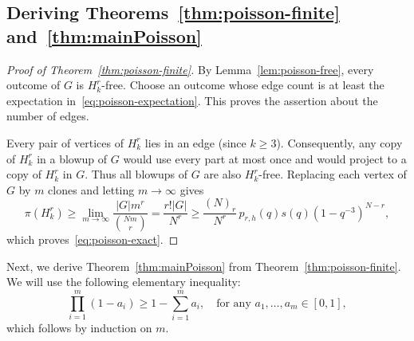 \documentclass[10pt,a4paper]{article}
\numberwithin{equation}{section}
\theoremstyle{definition}
\theoremstyle{remark}
\begin{document}
\subsection{Deriving  Theorems~\ref{thm:poisson-finite} and~\ref{thm:mainPoisson}}


\begin{proof}[Proof of Theorem~\ref{thm:poisson-finite}]
	By Lemma~\ref{lem:poisson-free}, every outcome of $G$ is $H_k^r$-free. Choose an outcome whose edge count is at least the expectation in~\eqref{eq:poisson-expectation}. This proves the assertion about the number of edges.
	
	Every pair of vertices of $H_k^r$ lies in an edge (since $k\ge 3$). Consequently, any copy of $H_k^r$ in a blowup of $G$ would use every part at most once and would project to a copy of $H_k^r$ in $G$. Thus all blowups of $G$ are also $H_k^r$-free. Replacing each vertex of $G$ by $m$ clones and letting $m\to\infty$ gives
	\[
	\pi(H_k^r)\ge\lim_{m\to\infty}\frac{|G|m^r}{\binom{Nm}r}
	=\frac{r!|G|}{N^r}
	\ge\frac{(N)_r}{N^r}\,p_{r,h}(q)s(q)(1-q^{-3})^{N-r},
	\]
	which proves~\eqref{eq:poisson-exact}.
\end{proof}


Next, we derive Theorem~\ref{thm:mainPoisson} from Theorem~\ref{thm:poisson-finite}. 
We will use the following elementary inequality:
\begin{equation}\label{eq:product-bound}
	\prod_{i=1}^m(1-a_i)\ge1-\sum_{i=1}^m a_i,
	\quad\text{for any }a_1,\ldots,a_m\in[0,1],
\end{equation}
which follows by induction on $m$. 
\end{document}
